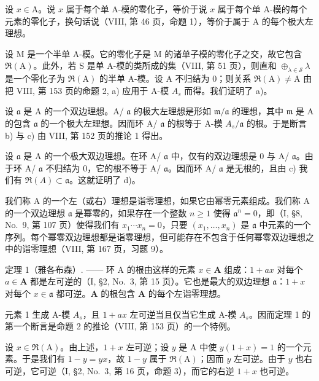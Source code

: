 设 \(x \in \mathrm{A}\)。说 \(x\) 属于每个单 A-模的零化子，等价于说 \(x\) 属于每个单 A-模的每个元素的零化子，换句话说（VIII, 第 46 页，命题 1），等价于属于 A 的每个极大左理想。

设 M 是一个半单 A-模。它的零化子是 M 的诸单子模的零化子之交，故它包含 \(\Re(\mathrm{A})\)。此外，若 S 是单 A-模的类所成的集（VIII, 第 51 页），则直和 \(\oplus_{\lambda\in\mathcal{S}}\lambda\) 是一个零化子为 \(\Re(\mathrm{A})\) 的半单 A-模。设 A 不归结为 0；则关系 \(\Re(\mathrm{A})\neq\mathrm{A}\) 由把 VIII, 第 153 页的命题 2, a) 应用于 A-模 \(A_{s}\) 而得。我们证明了 a)。

设 \(\mathfrak{a}\) 是 A 的一个双边理想。A/ \(\mathfrak{a}\) 的极大左理想是形如 \(\mathfrak{m}/\mathfrak{a}\) 的理想，其中 \(\mathfrak{m}\) 是 A 的包含 \(\mathfrak{a}\) 的一个极大左理想。因而环 A/ \(\mathfrak{a}\) 的根等于 A-模 \(A_s/\mathfrak{a}\) 的根。于是断言 b) 与 c) 由 VIII, 第 152 页的推论 1 得出。

设 \(\mathfrak{a}\) 是 A 的一个极大双边理想。在环 A/ \(\mathfrak{a}\) 中，仅有的双边理想是 0 与 A/ \(\mathfrak{a}\)。由于环 A/ \(\mathfrak{a}\) 不归结为 0，它的根不等于 A/ \(\mathfrak{a}\)。因而环 A/ \(\mathfrak{a}\) 是无根的，且由 c) 我们有 \(\Re(A) \subset \mathfrak{a}\)。这就证明了 d)。

我们称 A 的一个左（或右）理想是诣零理想，如果它由幂零元素组成。我们称 A 的一个双边理想 \(\mathfrak{a}\) 是幂零的，如果存在一个整数 \(n \geqslant 1\) 使得 \(\mathfrak{a}^n = 0\)，即（I, §8, No.~9, 第 107 页）使得我们有 \(x_1 \cdots x_n = 0\)，只要 \((x_1, \ldots, x_n)\) 是 \(\mathfrak{a}\) 中元素的一个序列。每个幂零双边理想都是诣零理想，但可能存在不包含于任何幂零双边理想之中的诣零理想（VIII, 第 167 页，习题 9）。

定理 1（雅各布森）. —— 环 A 的根由这样的元素 \(x \in \mathbf{A}\) 组成：\(1 + ax\) 对每个 \(a \in \mathbf{A}\) 都是左可逆的（I, §2, No.~3, 第 15 页）。它也是最大的双边理想 \(\mathfrak{a}\)：\(1 + x\) 对每个 \(x \in \mathfrak{a}\) 都可逆。\(\mathbf{A}\) 的根包含 \(\mathbf{A}\) 的每个左诣零理想。

元素 1 生成 A-模 \(A_{s}\)，且 \(1 + ax\) 左可逆当且仅当它生成 A-模 \(A_{s}\)。因而定理 1 的第一个断言是命题 2 的推论（VIII, 第 153 页）的一个特例。

设 \(x \in \Re(\mathrm{A})\)。由上述，\(1 + x\) 左可逆；设 \(y\) 是 \(\mathrm{A}\) 中使 \(y(1 + x) = 1\) 的一个元素。于是我们有 \(1 - y = yx\)，故 \(1 - y\) 属于 \(\Re(\mathrm{A})\)；因而 \(y\) 左可逆。由于 \(y\) 也右可逆，它可逆（I, §2, No.~3, 第 16 页，命题 3），而它的右逆 \(1 + x\) 也可逆。

